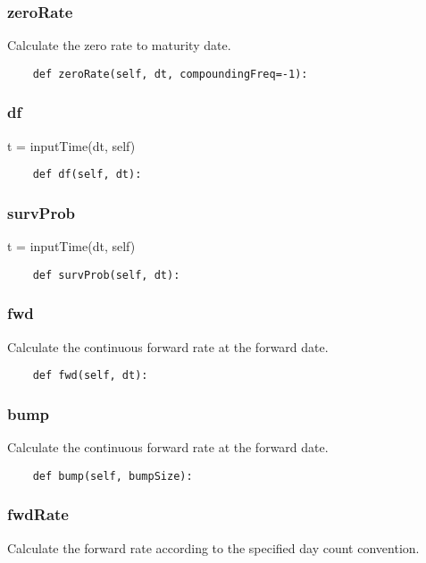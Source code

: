 \documentclass[twoside,11pt]{book}
\begin{document}
\subsubsection*{{\bf zeroRate}}
Calculate the zero rate to maturity date.  

\begin{lstlisting}
    def zeroRate(self, dt, compoundingFreq=-1):
\end{lstlisting}

\subsubsection*{{\bf df}}
t = inputTime(dt, self) 

\begin{lstlisting}
    def df(self, dt):
\end{lstlisting}

\subsubsection*{{\bf survProb}}
t = inputTime(dt, self) 

\begin{lstlisting}
    def survProb(self, dt):
\end{lstlisting}

\subsubsection*{{\bf fwd}}
Calculate the continuous forward rate at the forward date.  

\begin{lstlisting}
    def fwd(self, dt):
\end{lstlisting}

\subsubsection*{{\bf bump}}
Calculate the continuous forward rate at the forward date.  

\begin{lstlisting}
    def bump(self, bumpSize):
\end{lstlisting}

\subsubsection*{{\bf fwdRate}}
Calculate the forward rate according to the specified day count convention.  
\end{document}

